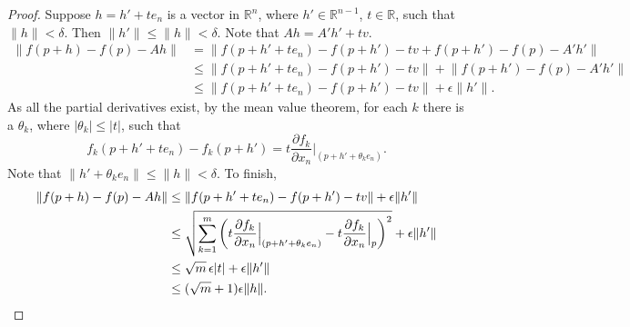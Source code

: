 \documentclass[12pt,openany]{book}
\newcommand{\sabs}[1]{\lvert {#1} \rvert}
\newcommand{\snorm}[1]{\lVert {#1} \rVert}
\newcommand{\R}{{\mathbb{R}}}
\theoremstyle{plain}
\theoremstyle{remark}
\theoremstyle{definition}
\theoremstyle{exercise}
\theoremstyle{example}
\begin{document}
\begin{proof}
Suppose $h = h' + t e_n$ is a vector in $\R^n$, where $h' \in \R^{n-1}$,
$t \in \R$, such that
$\snorm{h} < \delta$.  Then $\snorm{h'} \leq \snorm{h} < \delta$.
Note that $Ah = A' h' + tv$.
\begin{equation*}
\begin{split}
\snorm{f(p+h) - f(p) - Ah}
& = \snorm{f(p+h' + t e_n) - f(p+h') - tv + f(p+h') - f(p) - A' h'}
\\
& \leq \snorm{f(p+h' + t e_n) - f(p+h') -tv} + \snorm{f(p+h') - f(p) -
A' h'}
\\
& \leq \snorm{f(p+h' + t e_n) - f(p+h') -tv} + \epsilon \snorm{h'} .
\end{split}
\end{equation*}
As all the partial derivatives exist, by the mean value theorem,
for each $k$ there is a $\theta_k$, where $\sabs{\theta_k} \leq \sabs{t}$, such that
\begin{equation*}
f_k(p+h' + t e_n) - f_k(p+h') =
t \frac{\partial f_k}{\partial x_n}\Big|_{(p+h'+\theta_k e_n)}.
\end{equation*}
Note that $\snorm{h'+\theta_k e_n} \leq \snorm{h} < \delta$.
To finish,
\begin{equation*}
\begin{split}
\snorm{f(p+h) - f(p) - Ah}
& \leq \snorm{f(p+h' + t e_n) - f(p+h') -tv} + \epsilon \snorm{h'}
\\
& \leq \sqrt{\sum_{k=1}^m
{\left(t\frac{\partial f_k}{\partial x_n}\Big|_{(p+h'+\theta_k e_n)} -
t \frac{\partial f_k}{\partial x_n}\Big|_{p}\right)}^2} + \epsilon \snorm{h'}
\\
& \leq \sqrt{m}\, \epsilon \sabs{t} + \epsilon \snorm{h'}
\\
& \leq (\sqrt{m}+1)\epsilon \snorm{h} . \qedhere
\end{split}
\end{equation*}
\end{proof}
\end{document}
